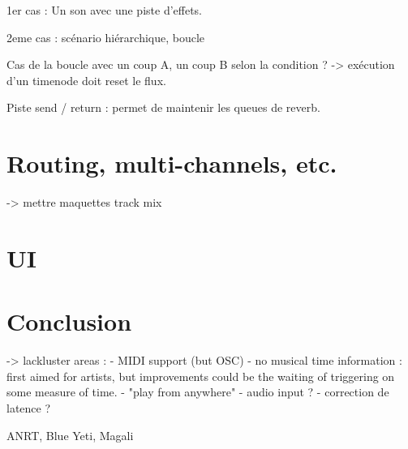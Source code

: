 \documentclass{article}
\begin{document}
1er cas : 
Un son avec une piste d'effets.

2eme cas : scénario hiérarchique, boucle

Cas de la boucle avec un coup A, un coup B selon la condition ? 
-> exécution d'un timenode doit reset le flux.

Piste send / return : permet de maintenir les queues de reverb.

\section{Routing, multi-channels, etc.}
-> mettre maquettes track mix
\section{UI}

\section{Conclusion}
-> lackluster areas : 
- MIDI support (but OSC)
- no musical time information : first aimed for artists, 
but improvements could be the waiting of triggering on some measure of time.
- "play from anywhere"
- audio input ?
- correction de latence ?
\begin{acknowledgments}
    ANRT, Blue Yeti, Magali
\end{acknowledgments} 


\end{document}
